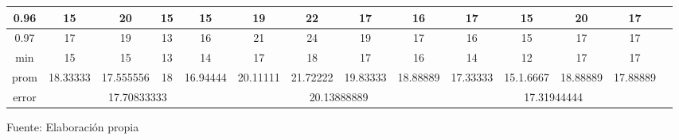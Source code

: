 \begin{center}
\begin{table}[H]
{\begin{tabular}{|c|c|c|c|c|c|c|c|c|c|c|c|c|c|}
\hline 
0.96 & 
15 & 20 & 15 & 15 & 19 & 22 & 17 & 16 & 17 & 15 & 20 & 17 \\
\hline 
0.97 & 
17 & 19 & 13 & 16 & 21 & 24 & 19 & 17 & 16 & 15 & 17 & 17 \\
\hline 
min & 
15 & 15 & 13 & 14 & 17 & 18 & 17 & 16 & 14 & 12 & 17 & 17 \\
\hline 
prom & 
18.33333 & 17.555556 & 18 & 16.94444 & 20.11111 & 21.72222 & 19.83333 & 18.88889 & 17.33333 & 15.1.6667 & 18.88889 & 17.88889 \\
\hline 
error & 
\multicolumn{4}{c|}{17.70833333} & 
\multicolumn{4}{c|}{20.13888889} & 
\multicolumn{4}{c|}{17.31944444}\\ 
\hline 
\end{tabular} 
}
\begin{center}
\vskip 0.2cm
{\small{Fuente: Elaboración propia}}
\end{center}
\end{table}
\end{center}


